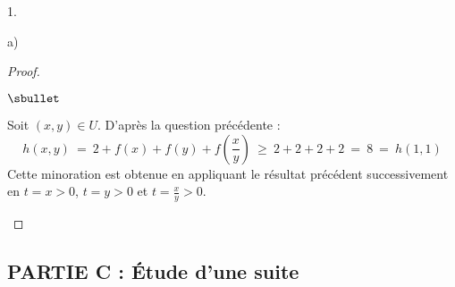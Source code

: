 \documentclass[11pt]{article}%
\begin{document}
\begin{noliste}{1.}
\begin{noliste}{a)}
\begin{proof}
\begin{noliste}{$\sbullet$}
      \item Soit $(x, y) \in U$. D'après la question précédente :
        \[
        h(x, y) \ = \ 2 + f(x) + f(y) + f\left( \dfrac{x}{y} \right)
        \ \geq \ 2 + 2 + 2 + 2 \ = \ 8 \ = \ h(1, 1)
        \]
        Cette minoration est obtenue en appliquant le résultat
        précédent successivement en $t = x > 0$, $t = y > 0$ et $t =
        \frac{x}{y} > 0$. %
        ~\\[-1.4cm] 
      \end{noliste}
    \end{proof}
  \end{noliste}
\end{noliste}


\subsection*{PARTIE C : \'Etude d'une suite} %
\end{document}
